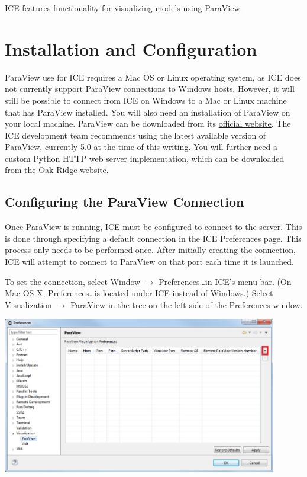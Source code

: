 ICE features functionality for visualizing models using ParaView.

\section{Installation and Configuration}

ParaView use for ICE requires a Mac OS or Linux operating system, as ICE does
not currently support ParaView connections to Windows hosts. However, it will
still be possible to connect from ICE on Windows to a Mac or Linux machine
that has ParaView installed. You will also need an installation of ParaView on
your local machine.
ParaView can be downloaded from its \href{http://www.paraview.org/download/}{official website}. The ICE
development team recommends using the latest available version of ParaView,
currently 5.0 at the time of this writing. You will further need a custom
Python HTTP web server implementation, which can be downloaded from the
\href{http://eclipseice.ornl.gov/downloads/paraview/scripts/http_pvw_server.py}{Oak
Ridge website}.

\subsection{Configuring the ParaView Connection}

Once ParaView is running, ICE must be configured to connect to the server. This
is done through specifying a default connection in the ICE Preferences page.
This process only needs to be performed once. After initially creating the
connection, ICE will attempt to connect to ParaView on that port each time it is
launched.

To set the connection, select Window $\rightarrow$ Preferences\ldots in ICE's
menu bar. (On Mac OS X, Preferences\ldots is located under ICE instead of
Windows.) Select Visualization $\rightarrow$ ParaView in the tree on the left
side of the Preferences window.

\begin{center}
\includegraphics[width=12cm]{images/paraviewpreferencepage_ice}
\end{center}

